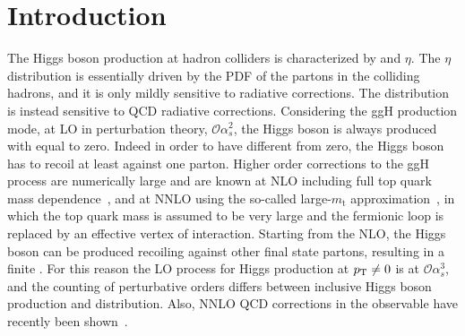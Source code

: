 \section{Introduction}
\label{sec:Introduction}


The Higgs boson production at hadron colliders is characterized by \pth and $\eta$. The $\eta$ distribution is essentially driven by the PDF of the partons in the colliding hadrons, and it is only mildly sensitive to radiative corrections. The \pth distribution is instead sensitive to QCD radiative corrections. 
Considering the ggH production mode, at LO in perturbation theory, $\mathcal{O}{\alpha_s^2}$, the Higgs boson is always produced with \pth equal to zero. Indeed in order to have \pt different from zero, the Higgs boson has to recoil at least against one parton. Higher order corrections to the ggH process are numerically large and are known at NLO including full top quark mass dependence~\cite{Spira:1995rr,Harlander:2005rq}, and at NNLO using the so-called large-$m_\mathrm{t}$ approximation~\cite{Ravindran:2003um,Catani:2007vq,Anastasiou:2015ema}, in which the top quark mass is assumed to be very large and the fermionic loop is replaced by an effective vertex of interaction. Starting from the NLO, the Higgs boson can be produced recoiling against other final state partons, resulting in a finite \pth. For this reason the LO process for Higgs production at $p_\mathrm{T} \neq 0$ is at $\mathcal{O}{\alpha_s^3}$, and the counting of perturbative orders differs between inclusive Higgs boson production and \pth distribution. Also, NNLO QCD corrections in the \pth observable have recently been shown~\cite{Chen:2016zka}.


